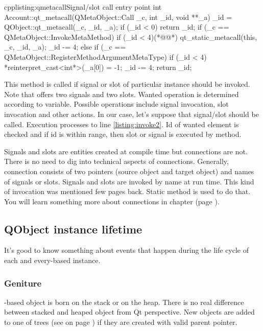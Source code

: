 \begin{fdoccode}{cpp}{listing:qmetacall}{Signal/slot call entry point}
int Account::qt_metacall(QMetaObject::Call _c, int _id, void **_a)
{
    _id = QObject::qt_metacall(_c, _id, _a);
    if (_id < 0)
        return _id;
    if (_c == QMetaObject::InvokeMetaMethod) {
        if (_id < 4)(*@\label{listing:invoke2}@*)
            qt_static_metacall(this, _c, _id, _a);
        _id -= 4;
    } else if (_c == QMetaObject::RegisterMethodArgumentMetaType) {
        if (_id < 4)
            *reinterpret_cast<int*>(_a[0]) = -1;
        _id -= 4;
    }
    return _id;
}
\end{fdoccode}

This method is called if signal or slot of particular instance should be invoked. Note that offers two signals and two slots. Wanted operation is determined according to variable. Possible operations include signal invocation, slot invocation and other actions. In our case, let's suppose that signal/slot should be called. Execution processes to line \ref{listing:invoke2}. Id of wanted element is checked and if id is within range, then slot or signal is executed by method.

Signals and slots are entities created at compile time but connections are not. There is no need to dig into technical aspects of connections. Generally, connection consists of two pointers (source object and target object) and names of signals or slots. Signals and slots are invoked by name at run time. This kind of invocation was mentioned few pages back. Static method is used to do that. \citep[QMetaObject class]{various:qtdoc}  You will learn something more about connections in chapter  (page \pageref{section:thread}).



\subsection{QObject instance lifetime}
It's good to know something about events that happen during the life cycle of each and every-based instance.

\subsubsection*{Geniture}
-based object is born on the stack or on the heap. There is no real difference between stacked and heaped object from Qt perspective. New objects are added to one of trees (see  on page \pageref{section:model}) if they are created with valid parent pointer.

